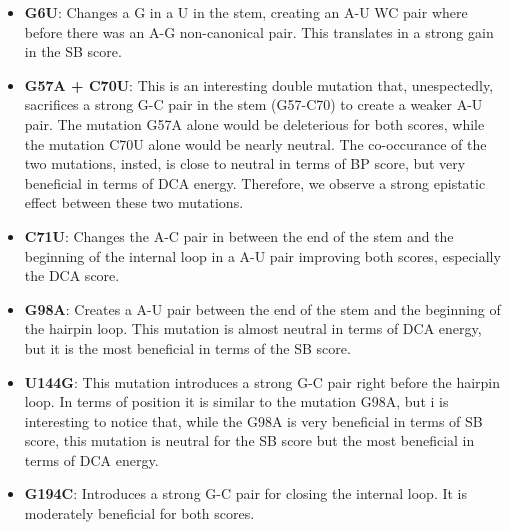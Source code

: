 \documentclass{article}
\begin{document}
\begin{itemize}
    \item \textbf{G6U}: Changes a G in a U in the stem, creating an A-U WC pair where before there was an A-G non-canonical pair. This translates in a strong gain in the SB score.
    \item \textbf{G57A + C70U}: This is an interesting double mutation that, unespectedly, sacrifices a strong G-C pair in the stem (G57-C70) to create a weaker A-U pair.
    The mutation G57A alone would be deleterious for both scores, while the mutation C70U alone would be nearly neutral. The co-occurance of the two mutations, insted, is close to neutral in terms of BP score, but very beneficial in terms of DCA energy. Therefore, we observe a strong epistatic effect between these two mutations.
    \item \textbf{C71U}: Changes the A-C pair in between the end of the stem and the beginning of the internal loop in a A-U pair improving both scores, especially the DCA score.
    \item \textbf{G98A}: Creates a A-U pair between the end of the stem and the beginning of the hairpin loop. This mutation is almost neutral in terms of DCA energy, but it is the most beneficial in terms of the SB score.
    \item \textbf{U144G}: This mutation introduces a strong G-C pair right before the hairpin loop. In terms of position it is similar to the mutation G98A, but i is interesting to notice that, while the 
    G98A is very beneficial in terms of SB score, this mutation is neutral for the SB score but the most beneficial in terms of DCA energy.
    \item \textbf{G194C}: Introduces a strong G-C pair for closing the internal loop. It is moderately beneficial for both scores.
\end{itemize}
\end{document}
